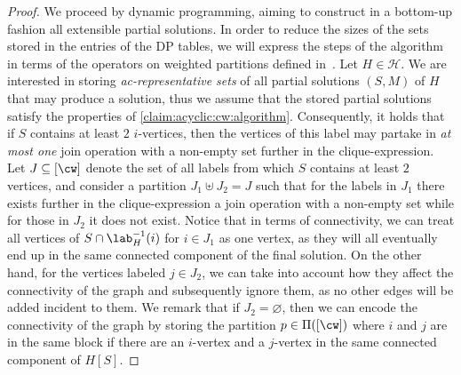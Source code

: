 \begin{proof}
    We proceed by dynamic programming, aiming to construct in a bottom-up fashion all extensible partial solutions.
    In order to reduce the sizes of the sets stored in the entries of the DP tables,
    we will express the steps of the algorithm in terms of the operators on weighted partitions defined in~\cite{tcs/BergougnouxK19}.
    Let $H \in \mathcal{H}$.
    We are interested in storing \emph{ac-representative sets} of all partial solutions $(S,M)$ of $H$ that may produce a solution,
    thus we assume that the stored partial solutions satisfy the properties of \cref{claim:acyclic:cw:algorithm}.
    Consequently, it holds that if $S$ contains at least $2$ $i$-vertices, then the vertices of this label may
    partake in \emph{at most one} join operation with a non-empty set further in the clique-expression.
    Let $J \subseteq [\cw]$ denote the set of all labels from which $S$ contains at least $2$ vertices,
    and consider a partition $J_1 \uplus J_2 = J$ such that for the labels in $J_1$ there exists further in the clique-expression
    a join operation with a non-empty set while for those in $J_2$ it does not exist.
    Notice that in terms of connectivity, we can treat all vertices of $S \cap \lab^{-1}_H(i)$ for $i \in J_1$
    as one vertex, as they will all eventually end up in the same connected component of the final solution.
    On the other hand, for the vertices labeled $j \in J_2$,
    we can take into account how they affect the connectivity of the graph and subsequently ignore them,
    as no other edges will be added incident to them.
    We remark that if $J_2 = \varnothing$,
    then we can encode the connectivity of the graph by storing the partition $p \in \Pi([\cw])$ where
    $i$ and $j$ are in the same block if there are
    an $i$-vertex and a $j$-vertex in the same connected component of $H[S]$.




\end{proof}
